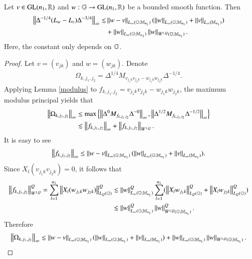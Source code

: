 \documentclass[leqno]{amsart}
\begin{document}
	
	\begin{lemma}\label{w1qa-b}
		Let $v\in{\rm GL}(n_{1},\mathbb{R})$ and $w:\mathbb{G}\rightarrow{\rm GL}(n_{1},\mathbb{R})$ be a bounded smooth function. Then
		\begin{align*}
			\left\| \Delta^{-1/4}(L_{w}-L_{v})\Delta^{-3/4} \right\|_{\infty}
			\lesssim &\left\| w-v \right\|_{L_{\infty}(\mathbb{G};\mathbb{M}_{n_{1}})} (\left\| w \right\|_{L_{\infty}(\mathbb{G};\mathbb{M}_{n_{1}})}+\left\| v \right\|_{L_{\infty}(\mathbb{M}_{n_{1}})})\\
			&+\left\| w \right\|_{L_{\infty}(\mathbb{G};\mathbb{M}_{n_{1}})}\left\| w \right\|_{\dot{W}^{1,Q}(\mathbb{G};\mathbb{M}_{n_{1}})}.
		\end{align*}
		Here, the constant only depends on $\mathbb{G}$.
	\end{lemma}
	\begin{proof}
		Let $v=(v_{jk})$ and $w=(w_{jk})$.
		Denote
		\begin{align*}
			\Omega_{k,j_{1},j_{2}}=\Delta^{1/4}M_{v_{j_{1}k}v_{j_{2}k}-w_{j_{1}k}w_{j_{2}k}}\Delta^{-1/4}.
		\end{align*}
		Applying Lemma \ref{modulus} to $f_{k,j_{1},j_{2}}=v_{j_{1}k}v_{j_{2}k}-w_{j_{1}k}w_{j_{2}k}$, 
		the maximum modulus principal yields that
		\begin{align*}
			\left\| \Omega_{k,j_{1},j_{2}} \right\|_{\infty}
			&\leq\max\left\{\left\| \Delta^{0}M_{f_{k,j_{1},j_{2}}}\Delta^{-0} \right\|_{\infty},\left\| \Delta^{1/2}M_{f_{k,j_{1},j_{2}}}\Delta^{-1/2} \right\|_{\infty}\right\}\\
			&\lesssim\left\| f_{k,j_{1},j_{2}} \right\|_{\infty}+\left\| f_{k,j_{1},j_{2}} \right\|_{\dot{W}^{1,Q}}.
		\end{align*}
		It is easy to see
		\begin{align*}
			\left\| f_{k,j_{1},j_{2}} \right\|_{\infty}
			\leq\left\| w-v \right\|_{L_{\infty}(\mathbb{G};\mathbb{M}_{n_{1}})}(\left\| w \right\|_{L_{\infty}(\mathbb{G};\mathbb{M}_{n_{1}})}+\left\| v \right\|_{L_{\infty}(\mathbb{M}_{n_{1}})}).
		\end{align*}
		Since $X_{l}(v_{j_{1}k}v_{j_{2}k})=0$, it follows that
		\begin{align*}
			\left\| f_{k,j_{1},j_{2}} \right\|_{\dot{W}^{1,Q}}^{Q}
			=\sum_{l=1}^{n_{1}}\left\| X_{l}(w_{j_{1}k}w_{j_{2}k}) \right\|_{L_{Q}(\mathbb{G})}^{Q}
			&\lesssim\left\| w \right\|_{L_{\infty}(\mathbb{G};\mathbb{M}_{n_{1}})}^{Q}\sum_{l=1}^{n_{1}}
			(\left\| X_{l}w_{j_{1}k} \right\|_{L_{Q}(\mathbb{G})}^{Q}+\left\| X_{l}w_{j_{2}k} \right\|_{L_{Q}(\mathbb{G})}^{Q})\\
			&\lesssim\left\| w \right\|_{L_{\infty}(\mathbb{G};\mathbb{M}_{n_{1}})}^{Q}\left\| w \right\|_{\dot{W}^{1,Q}(\mathbb{G};\mathbb{M}_{n_{1}})}^{Q}.
		\end{align*}
		Therefore
		\begin{align}\label{sobolevo}
			\left\| \Omega_{k,j_{1},j_{2}} \right\|_{\infty}
			\lesssim\left\| w-v \right\|_{L_{\infty}(\mathbb{G};\mathbb{M}_{n_{1}})}(\left\| w \right\|_{L_{\infty}(\mathbb{G};\mathbb{M}_{n_{1}})}+\left\| v \right\|_{L_{\infty}(\mathbb{M}_{n_{1}})})
			+\left\| w \right\|_{L_{\infty}(\mathbb{G};\mathbb{M}_{n_{1}})}\left\| w \right\|_{\dot{W}^{1,Q}(\mathbb{G};\mathbb{M}_{n_{1}})}.
		\end{align}
		

\end{proof}
\end{document}
